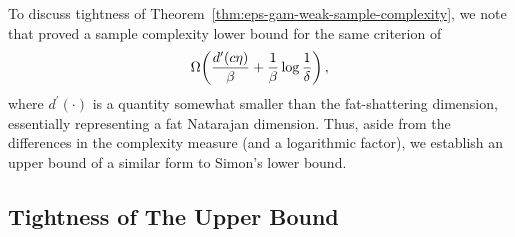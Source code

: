 To discuss tightness of Theorem~\ref{thm:eps-gam-weak-sample-complexity}, we note that
\citet{DBLP:journals/siamcomp/Simon97} proved a sample complexity lower bound 
for the same criterion of 
\begin{equation*}
\Omega\!\left( \frac{d^{\prime}(c \eta)}{\beta} + \frac{1}{\beta} \log \frac{1}{\delta} \right),
\end{equation*}
where $d^{\prime}(\cdot)$ is a quantity somewhat smaller than the fat-shattering dimension, 
essentially representing a fat Natarajan dimension.
Thus, aside from the differences in the complexity measure (and a logarithmic factor), 
we establish an upper bound of a similar form to Simon's lower bound.
%


    



\subsection{Tightness of The Upper Bound}

\blindmathpaper

    


